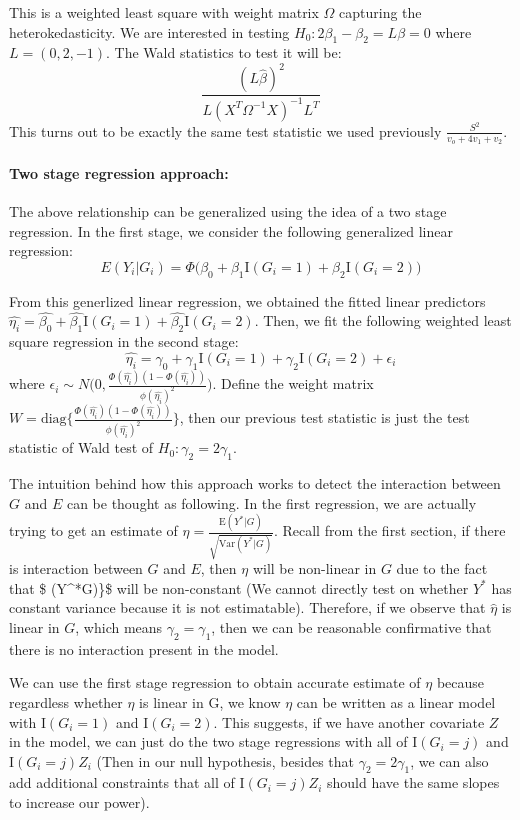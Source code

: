 \documentclass[]{article}
\let\oldparagraph\paragraph
\renewcommand{\paragraph}[1]{\oldparagraph{#1}\mbox{}}
\begin{document}
This is a weighted least square with weight matrix \(\Omega\) capturing
the heterokedasticity. We are interested in testing
\(H_0 : 2\beta_1 - \beta_2 = L\beta = 0\) where \(L = (0,2,-1)\). The
Wald statistics to test it will be:
\[ \frac{(L\hat{\beta})^2}{L(X^T \Omega^{-1}X)^{-1}L^T}\] This turns out
to be exactly the same test statistic we used previously
\(\frac{S^2}{v_o+4v_1+v_2}\).

\hypertarget{two-stage-regression-approach}{%
\paragraph{Two stage regression
approach:}\label{two-stage-regression-approach}}

The above relationship can be generalized using the idea of a two stage
regression. In the first stage, we consider the following generalized
linear regression:
\[ E(Y_i|G_i) = \Phi\bigg(\beta_0+ \beta_1 \text{I}(G_i =1) + \beta_2 \text{I}(G_i =2)\bigg)\]

From this generlized linear regression, we obtained the fitted linear
predictors
\(\hat{\eta_i} = \hat{\beta_0}+\hat{\beta_1}\text{I}(G_i =1) + \hat{\beta_2} \text{I}(G_i =2)\).
Then, we fit the following weighted least square regression in the
second stage:
\[ \hat{\eta_i} = \gamma_0 +\gamma_1  \text{I}(G_i =1) + \gamma_2 \text{I}(G_i =2) +\epsilon_i\]
where
\(\epsilon_i \sim N\bigg(0,\frac{\Phi(\hat{\eta_i})(1-\Phi(\hat{\eta_i}))}{\phi(\hat{\eta_i})^2} \bigg)\).
Define the weight matrix
\(W = \text{diag}\{\frac{\Phi(\hat{\eta_i})(1-\Phi(\hat{\eta_i}))}{\phi(\hat{\eta_i})^2}\}\),
then our previous test statistic is just the test statistic of Wald test
of \(H_0:\gamma_2 = 2\gamma_1\).

The intuition behind how this approach works to detect the interaction
between \(G\) and \(E\) can be thought as following. In the first
regression, we are actually trying to get an estimate of
\(\eta = \frac{\text{E}(Y^*|G)}{\sqrt{\text{Var}(Y^*|G)}}\). Recall from
the first section, if there is interaction between \(G\) and \(E\), then
\(\eta\) will be non-linear in \(G\) due to the fact that \$
(Y\^{}*\textbar{}G)\}\$ will be non-constant (We cannot
directly test on whether \(Y^*\) has constant variance because it is not
estimatable). Therefore, if we observe that \(\hat{\eta}\) is linear in
\(G\), which means \(\gamma_2 = \gamma_1\), then we can be reasonable
confirmative that there is no interaction present in the model.

We can use the first stage regression to obtain accurate estimate of
\(\eta\) because regardless whether \(\eta\) is linear in G, we know
\(\eta\) can be written as a linear model with \(\text{I}(G_i =1)\) and
\(\text{I}(G_i =2)\). This suggests, if we have another covariate \(Z\)
in the model, we can just do the two stage regressions with all of
\(\text{I}(G_i =j)\) and \(\text{I}(G_i =j)Z_i\) (Then in our null
hypothesis, besides that \(\gamma_2 = 2 \gamma_1\), we can also add
additional constraints that all of \(\text{I}(G_i =j)Z_i\) should have
the same slopes to increase our power).
\end{document}
